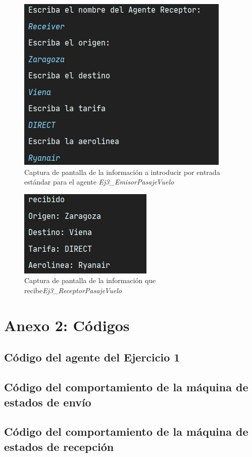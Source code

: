 \documentclass[10pt,a4paper]{article}
\begin{document}
\begin{figure}[h!]
\centering
\includegraphics[scale=1]{images/sender_ej3.jpg}
\caption{Captura de pantalla de la información a introducir por entrada estándar para el agente \emph{Ej3\_EmisorPasajeVuelo}}
\label{fig:ej3_sender}
\end{figure}

\begin{figure}[h!]
\centering
\includegraphics[scale=1]{images/receiver_ej3.jpg}
\caption{Captura de pantalla de la información que recibe\emph{Ej3\_ReceptorPasajeVuelo}}
\label{fig:ej3_reveiver}
\end{figure}

\newpage
\section{Anexo 2: Códigos}

\subsection{Código del agente del Ejercicio 1}



\subsection{Código del comportamiento de la máquina de estados de envío}



\subsection{Código del comportamiento de la máquina de estados de recepción}


\end{document}
